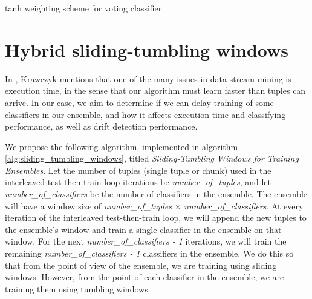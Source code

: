\begin{algorithm}
    \caption{\label{alg:new_voting_scheme}tanh weighting scheme for voting classifier}
\end{algorithm}




\section{Hybrid sliding-tumbling windows\label{section:hybrid-windows}}
In \cite{KRAWCZYK2017132}, Krawczyk mentions that one of the many issues in data stream mining is execution time, in the sense that our algorithm must learn faster than tuples can arrive. In our case, we aim to determine if we can delay training of some classifiers in our ensemble, and how it affects execution time and classifying performance, as well as drift detection performance.

We propose the following algorithm, implemented in algorithm \ref{alg:sliding_tumbling_windows}, titled \textit{Sliding-Tumbling Windows for Training Ensembles}.
Let the number of tuples (single tuple or chunk) used in the interleaved test-then-train loop iterations be \textit{number\_of\_tuples}, and let \textit{number\_of\_classifiers} be the number of classifiers in the ensemble. The ensemble will have a window size of \textit{number\_of\_tuples} $\times$ \textit{number\_of\_classifiers}. At every iteration of the interleaved test-then-train loop, we will append the new tuples to the ensemble's window and train a single classifier in the ensemble on that window. For the next \textit{number\_of\_classifiers - 1} iterations, we will train the remaining \textit{number\_of\_classifiers - 1} classifiers in the ensemble. We do this so that from the point of view of the ensemble, we are training using sliding windows. However, from the point of each classifier in the ensemble, we are training them using tumbling windows.

